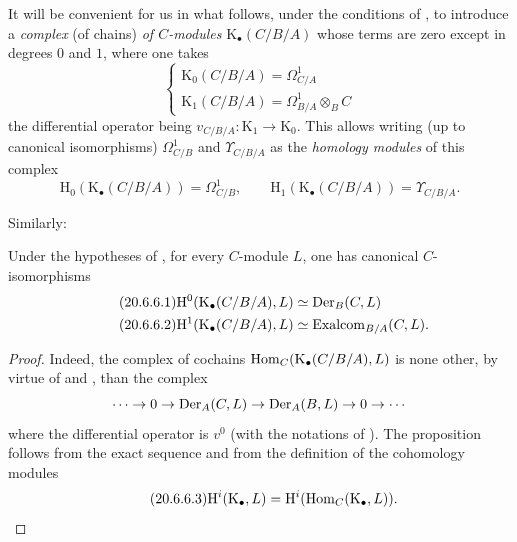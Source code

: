 \begin{env}[20.6.5]
\label{0.20.6.5}
It will be convenient for us in what follows, under the conditions of , to introduce a \emph{complex} (of chains) \emph{of $C$-modules} $\mathrm{K}_\bullet(C/B/A)$ whose terms are zero except in degrees $0$ and $1$, where one takes
\begin{equation}
\tag{20.6.5.1}
  \label{0.20.6.5.1}
  \begin{cases}
  \mathrm{K}_0(C/B/A)=\Omega^1_{C/A} \\
  \mathrm{K}_1(C/B/A)=\Omega^1_{B/A}\otimes_B C
  \end{cases}
\end{equation}
the differential operator being $v_{C/B/A}:\mathrm{K}_1\to\mathrm{K}_0$.
This allows writing (up to canonical isomorphisms) $\Omega^1_{C/B}$ and $\Upsilon_{C/B/A}$ as the \emph{homology modules} of this complex
\begin{equation}
\tag{20.6.5.2}
  \label{0.20.6.5.2}
  \mathrm{H}_0(\mathrm{K}_\bullet(C/B/A))=\Omega^1_{C/B},\qquad \mathrm{H}_1(\mathrm{K}_\bullet(C/B/A))=\Upsilon_{C/B/A}.
\end{equation}
\end{env}

Similarly:
\begin{proposition}[20.6.6]
\label{0.20.6.6}
Under the hypotheses of , for every $C$-module $L$, one has canonical $C$-isomorphisms
\begin{align}
\tag{20.6.6.1}
  \label{0.20.6.6.1}
  \mathrm{H}^0(\mathrm{K}_\bullet(C/B/A),L) &\simeq\operatorname{Der}_B(C,L) \\
\tag{20.6.6.2}
  \label{0.20.6.6.2}
  \mathrm{H}^1(\mathrm{K}_\bullet(C/B/A),L) &\simeq\operatorname{Exalcom}_{B/A}(C,L).
\end{align}
\end{proposition}

\begin{proof}
Indeed, the complex of cochains $\operatorname{Hom}_C(\mathrm{K}_\bullet(C/B/A),L)$ is none other, by virtue of  and , than the complex
\[
  \cdots\to 0\to\operatorname{Der}_A(C,L)\to\operatorname{Der}_A(B,L)\to 0\to\cdots
\]
where the differential operator is $v^0$ (with the notations of ).
The proposition follows from the exact sequence  and from the definition of the cohomology modules
\begin{equation}
\tag{20.6.6.3}
  \label{0.20.6.6.3}
  \mathrm{H}^i(\mathrm{K}_\bullet,L)=\mathrm{H}^i(\operatorname{Hom}_C(\mathrm{K}_\bullet,L)).
\end{equation}
\end{proof}

